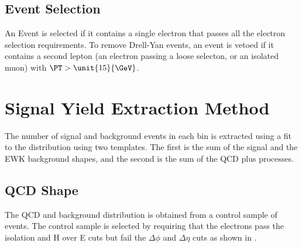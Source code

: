 \subsection{Event Selection}
An Event is selected if it contains a single electron that passes all the electron
selection requirements.
To remove Drell-Yan events, an event is vetoed if it contains a second lepton
(an electron passing a loose selecton, or an isolated muon) with $\PT > 
\unit{15}{\GeV}$.

\section{Signal Yield Extraction Method}
The number of signal and background events in each bin is extracted using a fit
to the \ETm distribution using two templates.
The first is the sum of the \Wenu signal and the \ac{EWK} background shapes,
and the second is the sum of the \ac{QCD} plus \gjet processes.

\subsection{\ac{QCD} \ETm Shape}
The \ac{QCD} and \gjet background distribution is obtained from a control sample of
events. The control sample is selected by requiring that the electrons pass the
isolation and H over E cuts but fail the $\Delta\phi$ and $\Delta\eta$ cuts as
shown in .


